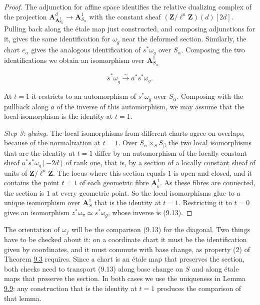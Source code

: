 \documentclass[11pt]{article}
\begin{document}
\begin{proof}[{Proof}]
The adjunction for affine space identifies the relative dualizing complex of the projection \(\mathbf A^d_{\mathbf A^1_{S_\alpha}}\to\mathbf A^1_{S_\alpha}\) with the constant sheaf \((\mathbf Z/\ell^n\mathbf Z)(d)[2d]\). Pulling back along the étale map just constructed, and composing adjunctions for it, gives the same identification for \(\omega_{\widetilde g}\) near the deformed section. Similarly, the chart \(e_\alpha\) gives the analogous identification of \(s^{*}\omega_{g}\) over \(S_\alpha\). Composing the two identifications we obtain an isomorphism over \(\mathbf A^1_{S_\alpha}\)

\[
\widetilde s^{*}\omega_{\widetilde g}\xrightarrow{\sim}
a^{*}s^{*}\omega_{g}.
\]

At \(t=1\) it restricts to an automorphism of \(s^{*}\omega_{g}\) over \(S_\alpha\). Composing with the pullback along \(a\) of the inverse of this automorphism, we may assume that the local isomorphism is the identity at \(t=1\).

\emph{Step 3: gluing.} The local isomorphisms from different charts agree on overlaps, because of the normalization at \(t=1\). Over \(S_\alpha\times_SS_\beta\) the two local isomorphisms that are the identity at \(t=1\) differ by an automorphism of the locally constant sheaf \(a^{*}s^{*}\omega_g[-2d]\) of rank one, that is, by a section of a locally constant sheaf of units of \(\mathbf Z/\ell^n\mathbf Z\). The locus where this section equals \(1\) is open and closed, and it contains the point \(t=1\) of each geometric fibre \(\mathbf A^1_{\bar b}\). As these fibres are connected, the section is \(1\) at every geometric point. So the local isomorphisms glue to a unique isomorphism over \(\mathbf A^1_S\) that is the identity at \(t=1\). Restricting it to \(t=0\) gives an isomorphism \(z^{*}\omega_{\pi}\simeq s^{*}\omega_g\), whose inverse is (9.13).
\end{proof}

\label{bp31}%
The orientation of \(\omega_f\) will be the comparison (9.13) for the diagonal. Two things have to be checked about it: on a coordinate chart it must be the identification given by coordinates, and it must commute with base change, as property (2) of Theorem \hyperref[bp11]{9.3} requires. Since a chart is an étale map that preserves the section, both checks need to transport (9.13) along base change on \(S\) and along étale maps that preserve the section. In both cases we use the uniqueness in Lemma \hyperref[bp29]{9.9}: any construction that is the identity at \(t=1\) produces the comparison of that lemma.
\end{document}
